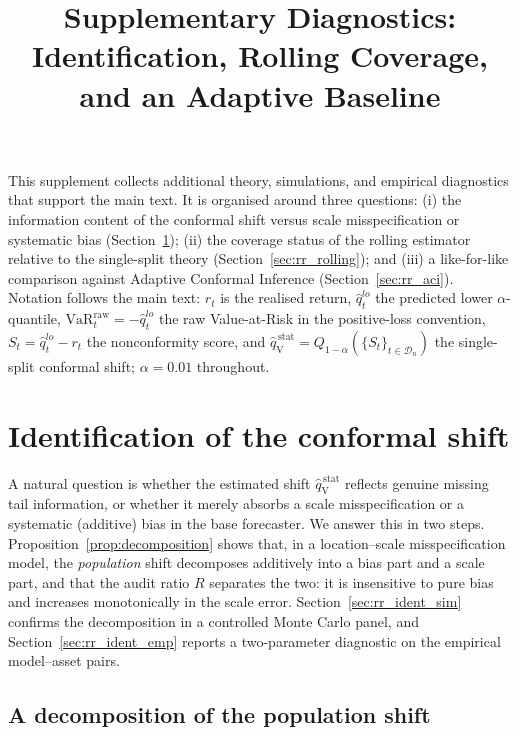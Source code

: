 \documentclass[11pt]{article}
\title{Supplementary Diagnostics:\\
Identification, Rolling Coverage, and an Adaptive Baseline}
\author{}
\date{}
\newcommand{\VaR}{\mathrm{VaR}}
\newcommand{\1}{\boldsymbol{1}}
\newcommand{\qVstat}{\hat{q}_{\scriptscriptstyle\mathrm{V}}^{\,\mathrm{stat}}}
\begin{document}
\maketitle

\noindent
This supplement collects additional theory, simulations, and empirical
diagnostics that support the main text. It is organised around three questions:
(i) the information content of the conformal shift versus scale misspecification
or systematic bias (Section~\ref{sec:rr_identification}); (ii) the coverage
status of the rolling estimator relative to the single-split theory
(Section~\ref{sec:rr_rolling});
and (iii) a like-for-like comparison against Adaptive Conformal Inference
(Section~\ref{sec:rr_aci}). Notation follows the main text: $r_t$ is the
realised return, $\hat q_t^{lo}$ the predicted lower $\alpha$-quantile,
$\VaR_t^{\mathrm{raw}}=-\hat q_t^{lo}$ the raw Value-at-Risk in the
positive-loss convention, $S_t=\hat q_t^{lo}-r_t$ the nonconformity score, and
$\qVstat=Q_{1-\alpha}(\{S_t\}_{t\in\mathcal D_n})$ the single-split conformal
shift; $\alpha=0.01$ throughout.

\section{Identification of the conformal shift}
\label{sec:rr_identification}

A natural question is whether the estimated shift $\qVstat$ reflects genuine
missing tail information, or whether it merely absorbs a scale
misspecification or a systematic (additive) bias in the base forecaster. We
answer this in two steps. Proposition~\ref{prop:decomposition} shows that, in a
location--scale misspecification model, the \emph{population} shift decomposes
additively into a bias part and a scale part, and that the audit ratio $R$
separates the two: it is insensitive to pure bias and increases monotonically
in the scale error. Section~\ref{sec:rr_ident_sim} confirms the decomposition
in a controlled Monte Carlo panel, and Section~\ref{sec:rr_ident_emp} reports a
two-parameter diagnostic on the empirical model--asset pairs.

\subsection{A decomposition of the population shift}
\end{document}
